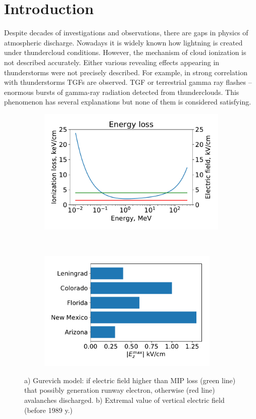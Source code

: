 \documentclass{webofc}
\begin{document}
\section{Introduction}
Despite decades of investigations and observations, there are gaps in physics of atmospheric discharge. Nowadays it is widely known how lightning is created under thundercloud conditions. However, the mechanism of cloud ionization is not described accurately. Either various revealing effects appearing in thunderstorms were not precisely described. For example, in strong correlation with thunderstorms TGFs are observed. TGF or terrestrial gamma ray flashes – enormous bursts of gamma-ray radiation detected from thunderclouds. This phenomenon has several explanations but none of them is considered satisfying.
\begin{figure}[ht!]
	\begin{subfigure}[b]{0.5\textwidth}
    	\includegraphics[width=0.95\linewidth]{pictures/01_Gurevich}
        \caption{}
        \label{pic-02-a}
    \end{subfigure}
	~
    \begin{subfigure}[b]{0.5\textwidth}
		\includegraphics[width=0.95\textwidth]{pictures/03_extremal_field}
        \caption{}
        \label{pic-02-b}
    \end{subfigure}
    \caption{
    a) Gurevich model: if electric field higher than MIP loss (green line) that possibly generation runway electron, otherwise (red line) avalanches discharged.
    b) Extremal value of vertical electric field (before 1989 y.)~\cite{mazin1989clouds}}
\end{figure}
\end{document}
